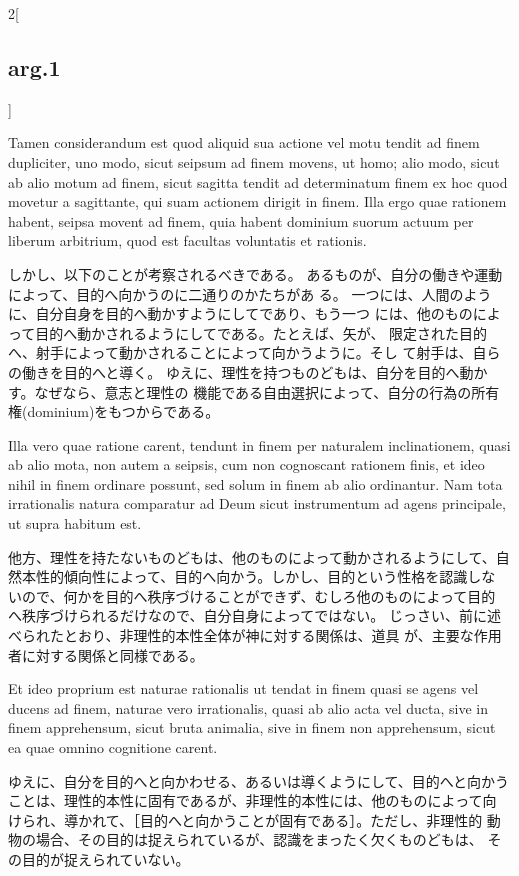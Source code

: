 \documentclass[paper=a4paper,fontsize=10pt,jafontsize=9pt,titlepage]{jlreq}
\begin{document}
\begin{paracol}{2}[\subsection{arg.1}]
\switchcolumn*

Tamen
considerandum est quod aliquid sua actione vel motu tendit ad finem
dupliciter, uno modo, sicut seipsum ad finem movens, ut homo; alio modo,
sicut ab alio motum ad finem, sicut sagitta tendit ad determinatum finem
ex hoc quod movetur a sagittante, qui suam actionem dirigit in
finem. Illa ergo quae rationem habent, seipsa movent ad finem, quia
habent dominium suorum actuum per liberum arbitrium, quod est facultas
voluntatis et rationis.

\switchcolumn

しかし、以下のことが考察されるべきである。
あるものが、自分の働きや運動によって、目的へ向かうのに二通りのかたちがあ
 る。
一つには、人間のように、自分自身を目的へ動かすようにしてであり、もう一つ
 には、他のものによって目的へ動かされるようにしてである。たとえば、矢が、
 限定された目的へ、射手によって動かされることによって向かうように。そし
 て射手は、自らの働きを目的へと導く。
ゆえに、理性を持つものどもは、自分を目的へ動かす。なぜなら、意志と理性の
 機能である自由選択によって、自分の行為の所有権(dominium)をもつからである。

\switchcolumn*

Illa vero quae ratione carent, tendunt in finem
per naturalem inclinationem, quasi ab alio mota, non autem a seipsis,
cum non cognoscant rationem finis, et ideo nihil in finem ordinare
possunt, sed solum in finem ab alio ordinantur. Nam tota irrationalis
natura comparatur ad Deum sicut instrumentum ad agens principale, ut
supra habitum est.

\switchcolumn

他方、理性を持たないものどもは、他のものによって動かされるようにして、自
 然本性的傾向性によって、目的へ向かう。しかし、目的という性格を認識しな
 いので、何かを目的へ秩序づけることができず、むしろ他のものによって目的
 へ秩序づけられるだけなので、自分自身によってではない。
じっさい、前に述べられたとおり、非理性的本性全体が神に対する関係は、道具
 が、主要な作用者に対する関係と同様である。

\switchcolumn*

Et ideo proprium est naturae rationalis ut tendat in
finem quasi se agens vel ducens ad finem, naturae vero irrationalis,
quasi ab alio acta vel ducta, sive in finem apprehensum, sicut bruta
animalia, sive in finem non apprehensum, sicut ea quae omnino cognitione
carent.

\switchcolumn

ゆえに、自分を目的へと向かわせる、あるいは導くようにして、目的へと向かう
 ことは、理性的本性に固有であるが、非理性的本性には、他のものによって向
 けられ、導かれて、［目的へと向かうことが固有である］。ただし、非理性的
 動物の場合、その目的は捉えられているが、認識をまったく欠くものどもは、
 その目的が捉えられていない。


\end{paracol}
\end{document}
